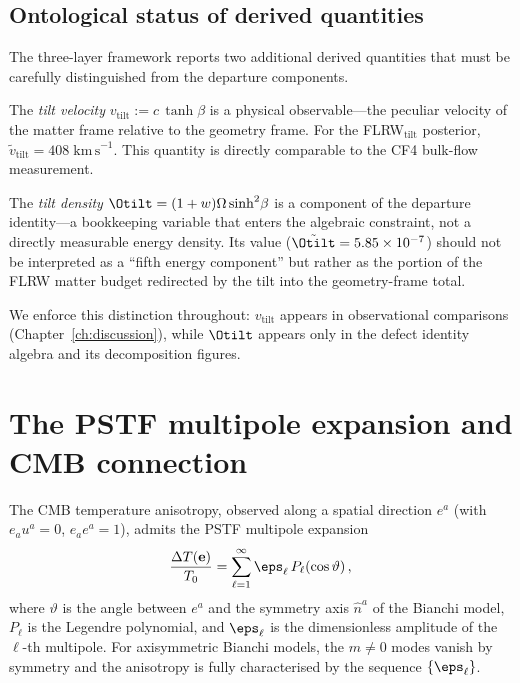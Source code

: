 \subsection{Ontological status of derived quantities}
\label{sec:ontology}

The three-layer framework reports two additional derived
quantities that must be carefully distinguished from the
departure components.

The \emph{tilt velocity}
$v_{\mathrm{tilt}} := c\,\tanh\beta$ is a physical
observable---the peculiar velocity of the matter frame
relative to the geometry frame.  For the FLRW$_{\mathrm{tilt}}$
posterior,
$\tilde{v}_{\mathrm{tilt}} = 408\;\mathrm{km\,s}^{-1}$.
This quantity is directly comparable to the CF4 bulk-flow
measurement.

The \emph{tilt density} $\Otilt = (1+w)\Omega\sinh^2\!\beta$
is a component of the departure identity---a bookkeeping
variable that enters the algebraic constraint, not a directly
measurable energy density.  Its value
($\tilde{\Otilt} = 5.85 \times 10^{-7}$) should not be
interpreted as a ``fifth energy component'' but rather as the
portion of the FLRW matter budget redirected by the tilt into
the geometry-frame total.

We enforce this distinction throughout: $v_{\mathrm{tilt}}$
appears in observational comparisons
(Chapter~\ref{ch:discussion}), while $\Otilt$ appears only in
the defect identity algebra and its decomposition figures.


\section{The PSTF multipole expansion and CMB connection}
\label{sec:pstf-cmb}

The CMB temperature anisotropy, observed along a spatial
direction $e^a$ (with $e_a u^a = 0$, $e_a e^a = 1$), admits
the PSTF multipole expansion
\begin{equation}\label{eq:CMB-multipole}
\frac{\Delta T(\mathbf{e})}{T_0}
= \sum_{\ell=1}^{\infty}
  \eps_\ell\,P_\ell(\cos\vartheta)\,,
\end{equation}
where $\vartheta$ is the angle between $e^a$ and the symmetry
axis $\hat{n}^a$ of the Bianchi model, $P_\ell$ is the Legendre
polynomial, and $\eps_\ell$ is the dimensionless amplitude of
the $\ell$-th multipole.  For axisymmetric Bianchi models, the
$m \neq 0$ modes vanish by symmetry and the anisotropy is fully
characterised by the sequence $\{\eps_\ell\}$.

